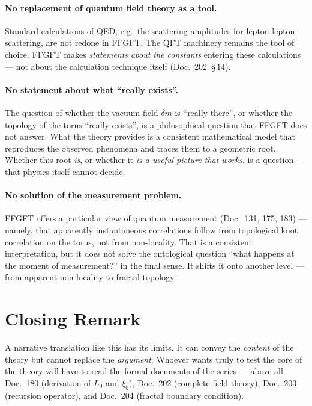 \paragraph{No replacement of quantum field theory as a tool.}
Standard calculations of QED, e.g.\ the scattering amplitudes for
lepton-lepton scattering, are not redone in FFGFT. The QFT
machinery remains the tool of choice. FFGFT makes \emph{statements
about the constants} entering these calculations --- not about the
calculation technique itself (Doc.~202~\S\,14).

\paragraph{No statement about what \enquote{really exists}.}
The question of whether the vacuum field $\delta m$ is
\enquote{really there}, or whether the topology of the torus
\enquote{really exists}, is a philosophical question that FFGFT
does not answer. What the theory provides is a consistent
mathematical model that reproduces the observed phenomena and
traces them to a geometric root. Whether this root \emph{is}, or
whether it \emph{is a useful picture that works}, is a question
that physics itself cannot decide.

\paragraph{No solution of the measurement problem.}
FFGFT offers a particular view of quantum measurement
(Doc.~131, 175, 183) --- namely, that apparently instantaneous
correlations follow from topological knot correlation on the torus,
not from non-locality. That is a consistent interpretation, but it
does not solve the ontological question \enquote{what happens at
the moment of measurement?} in the final sense. It shifts it onto
another level --- from apparent non-locality to fractal topology.

\section{Closing Remark}

A narrative translation like this has its limits. It can convey
the \emph{content} of the theory but cannot replace the
\emph{argument}. Whoever wants truly to test the core of the
theory will have to read the formal documents of the series ---
above all Doc.~180 (derivation of $L_0$ and $\xi_0$), Doc.~202
(complete field theory), Doc.~203 (recursion operator), and
Doc.~204 (fractal boundary condition).

